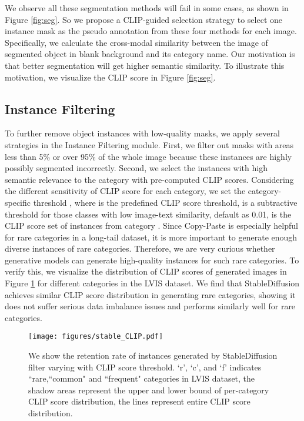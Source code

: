 \documentclass{article}
\begin{document}
We observe all these segmentation methods will fail in some cases, as shown in Figure \ref{fig:seg}. So we propose a CLIP-guided selection strategy to select one instance mask as the pseudo annotation from these four methods for each image. Specifically, we calculate the cross-modal similarity between the image of segmented object in blank background and its category name. Our motivation is that better segmentation will get higher semantic similarity. To illustrate this motivation, we visualize the CLIP score in Figure \ref{fig:seg}. 


\subsection{Instance Filtering}
To further remove object instances with low-quality masks, we apply several strategies in the Instance Filtering module. First, we filter out masks with areas less than 5\% or over 95\% of the whole image because these instances are highly possibly segmented incorrectly. Second, we select the instances with high semantic relevance to the category with pre-computed CLIP scores. Considering the different sensitivity of CLIP score for each category, we set the category-specific threshold , where  is the predefined CLIP score threshold,  is a subtractive threshold for those classes with low image-text similarity, default as 0.01,  is the CLIP score set of instances from category . Since Copy-Paste is especially helpful for rare categories in a long-tail dataset, it is more important to generate enough diverse instances of rare categories. Therefore, we are very curious whether generative models can generate high-quality instances for such rare categories. To verify this, we visualize the distribution of CLIP scores of generated images in Figure \ref{fig:stable_CLIP} for different categories in the LVIS dataset. We find that StableDiffusion achieves similar CLIP score distribution in generating rare categories, showing it does not suffer serious data imbalance issues and performs similarly well for rare categories.


\begin{figure}
   \centering
   \texttt{[image: figures/stable\_CLIP.pdf]}
\caption{We show the retention rate of instances generated by StableDiffusion filter varying with CLIP score threshold. `r', `c', and `f' indicates ``rare,``common" and ``frequent" categories in LVIS dataset, the shadow areas represent the upper and lower bound of per-category CLIP score distribution, the lines represent entire CLIP score distribution.}\vspace{-1em}
   \label{fig:stable_CLIP}
 \end{figure}
\end{document}
